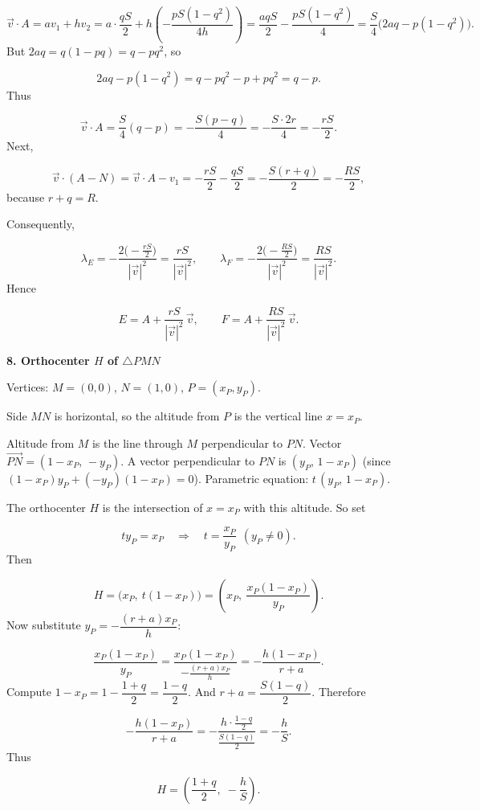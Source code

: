 \documentclass{llmxive}
\providecommand{\solutionheading}[1]{\par\smallskip\noindent\textbf{#1}\par}
\begin{document}
\[
\vec{v}\cdot A = a v_1 + h v_2 = a\cdot\frac{q S}{2} + h\left(-\frac{p S (1 - q^2)}{4h}\right) = \frac{a q S}{2} - \frac{p S (1 - q^2)}{4}
= \frac{S}{4}\bigl(2a q - p(1 - q^2)\bigr).
\]
But \(2a q = q(1 - p q) = q - p q^2\), so\par
\[
2a q - p(1 - q^2) = q - p q^2 - p + p q^2 = q - p.
\]
Thus\par
\[
\vec{v}\cdot A = \frac{S}{4}(q - p) = -\frac{S(p - q)}{4} = -\frac{S\cdot 2r}{4} = -\frac{r S}{2}.
\]
Next,\par
\[
\vec{v}\cdot(A - N) = \vec{v}\cdot A - v_1 = -\frac{r S}{2} - \frac{q S}{2} = -\frac{S(r+q)}{2} = -\frac{R S}{2},
\]
because \(r+q = R\).\par
Consequently,\par
\[
\lambda_E = -\frac{2\bigl(-\frac{r S}{2}\bigr)}{|\vec{v}|^2} = \frac{r S}{|\vec{v}|^2},
\qquad
\lambda_F = -\frac{2\bigl(-\frac{R S}{2}\bigr)}{|\vec{v}|^2} = \frac{R S}{|\vec{v}|^2}.
\]
Hence\par
\[
E = A + \frac{r S}{|\vec{v}|^2}\,\vec{v},
\qquad
F = A + \frac{R S}{|\vec{v}|^2}\,\vec{v}.
\]
\solutionheading{8. Orthocenter \(H\) of \(\triangle PMN\)}
Vertices: \(M = (0,0)\), \(N = (1,0)\), \(P = (x_P, y_P)\).\par
Side \(MN\) is horizontal, so the altitude from \(P\) is the vertical line \(x = x_P\).\par
Altitude from \(M\) is the line through \(M\) perpendicular to \(PN\). Vector \(\overrightarrow{PN} = (1 - x_P,\,-y_P)\). A vector perpendicular to \(PN\) is \((y_P,\, 1 - x_P)\) (since \((1-x_P)y_P + (-y_P)(1-x_P)=0\)). Parametric equation: \(t\,(y_P,\,1 - x_P)\).\par
The orthocenter \(H\) is the intersection of \(x = x_P\) with this altitude. So set\par
\[
t y_P = x_P \quad\Longrightarrow\quad t = \frac{x_P}{y_P}\ \ (y_P \neq 0).
\]
Then\par
\[
H = \bigl(x_P,\ t(1 - x_P)\bigr) = \left(x_P,\ \frac{x_P(1 - x_P)}{y_P}\right).
\]
Now substitute \(y_P = -\dfrac{(r+a)x_P}{h}\):\par
\[
\frac{x_P(1 - x_P)}{y_P} = \frac{x_P(1 - x_P)}{-\frac{(r+a)x_P}{h}} = -\frac{h(1 - x_P)}{r+a}.
\]
Compute \(1 - x_P = 1 - \dfrac{1+q}{2} = \dfrac{1 - q}{2}\). And \(r + a = \dfrac{S(1 - q)}{2}\). Therefore\par
\[
-\frac{h(1 - x_P)}{r+a} = -\frac{h \cdot \frac{1 - q}{2}}{\frac{S(1 - q)}{2}} = -\frac{h}{S}.
\]
Thus\par
\[
H = \left(\frac{1+q}{2},\; -\frac{h}{S}\right).
\]
\end{document}
